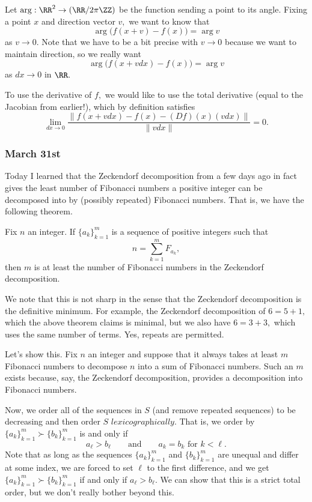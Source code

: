 Let $\arg:\RR^2\to(\RR/2\pi\ZZ)$ be the function sending a point to its angle. Fixing a point $x$ and direction vector $v,$ we want to know that
\[\arg\big(f(x+v)-f(x)\big)=\arg v\]
as $v\to0.$ Note that we have to be a bit precise with $v\to0$ because we want to maintain direction, so we really want
\[\arg\big(f(x+vdx)-f(x)\big)=\arg v\]
as $dx\to0$ in $\RR.$

To use the derivative of $f,$ we would like to use the total derivative (equal to the Jacobian from earlier!), which by definition satisfies
\[\lim_{dx\to0}\frac{\lVert f(x+vdx)-f(x)-(Df)(x)(vdx)\rVert}{\lVert vdx\rVert}=0.\]
\todo{}

\subsubsection{March 31st}
Today I learned that the Zeckendorf decomposition from a few days ago in fact gives the least number of Fibonacci numbers a positive integer can be decomposed into by (possibly repeated) Fibonacci numbers. That is, we have the following theorem.
\begin{theorem}
    Fix $n$ an integer. If $\{a_k\}_{k=1}^m$ is a sequence of positive integers such that
    \[n=\sum_{k=1}^mF_{a_k},\]
    then $m$ is at least the number of Fibonacci numbers in the Zeckendorf decomposition.
\end{theorem}
We note that this is not sharp in the sense that the Zeckendorf decomposition is the definitive minimum. For example, the Zeckendorf decomposition of $6=5+1,$ which the above theorem claims is minimal, but we also have $6=3+3,$ which uses the same number of terms. Yes, repeats are permitted.

Let's show this. Fix $n$ an integer and suppose that it always takes at least $m$ Fibonacci numbers to decompose $n$ into a sum of Fibonacci numbers. Such an $m$ exists because, say, the Zeckendorf decomposition, provides a decomposition into Fibonacci numbers.

Now, we order all of the sequences in $S$ (and remove repeated sequences) to be decreasing and then order $S$ $\textit{lexicographically}.$ That is, we order by $\{a_k\}_{k=1}^m\succ\{b_k\}_{k=1}^m$ is and only if
\[a_\ell>b_\ell\qquad\text{and}\qquad a_k=b_k\text{ for }k<\ell.\]
Note that as long as the sequences $\{a_k\}_{k=1}^m$ and $\{b_k\}_{k=1}^m$ are unequal and differ at some index, we are forced to set $\ell$ to the first difference, and we get $\{a_k\}_{k=1}^m\succ\{b_k\}_{k=1}^m$ if and only if $a_\ell>b_\ell.$ We can show that this is a strict total order, but we don't really bother beyond this.

